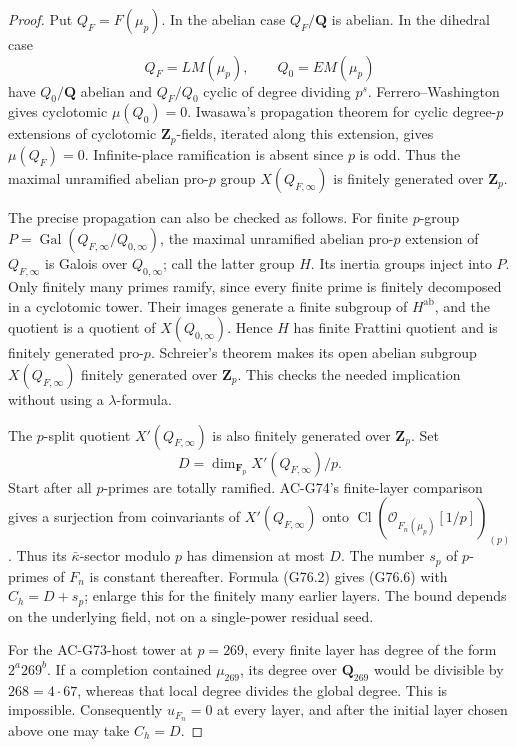 \begin{proof}
Put \(Q_F=F(\mu_p)\). In the abelian case \(Q_F/\mathbf Q\) is abelian. In the dihedral case
\[
 Q_F=LM(\mu_p),\qquad Q_0=EM(\mu_p)
\]
have \(Q_0/\mathbf Q\) abelian and \(Q_F/Q_0\) cyclic of degree dividing \(p^s\). Ferrero--Washington gives cyclotomic \(\mu(Q_0)=0\). Iwasawa's propagation theorem for cyclic degree-\(p\) extensions of cyclotomic \(\mathbf Z_p\)-fields, iterated along this extension, gives \(\mu(Q_F)=0\). Infinite-place ramification is absent since \(p\) is odd. Thus the maximal unramified abelian pro-\(p\) group \(X(Q_{F,\infty})\) is finitely generated over \(\mathbf Z_p\).

The precise propagation can also be checked as follows. For finite \(p\)-group \(P=\operatorname{Gal}(Q_{F,\infty}/Q_{0,\infty})\), the maximal unramified abelian pro-\(p\) extension of \(Q_{F,\infty}\) is Galois over \(Q_{0,\infty}\); call the latter group \(H\). Its inertia groups inject into \(P\). Only finitely many primes ramify, since every finite prime is finitely decomposed in a cyclotomic tower. Their images generate a finite subgroup of \(H^{\mathrm{ab}}\), and the quotient is a quotient of \(X(Q_{0,\infty})\). Hence \(H\) has finite Frattini quotient and is finitely generated pro-\(p\). Schreier's theorem makes its open abelian subgroup \(X(Q_{F,\infty})\) finitely generated over \(\mathbf Z_p\). This checks the needed implication without using a \(\lambda\)-formula.

The \(p\)-split quotient \(X'(Q_{F,\infty})\) is also finitely generated over \(\mathbf Z_p\). Set
\[
 D=\dim_{\mathbf F_p}X'(Q_{F,\infty})/p.
\]
Start after all \(p\)-primes are totally ramified. AC-G74's finite-layer comparison gives a surjection from coinvariants of \(X'(Q_{F,\infty})\) onto
\(\operatorname{Cl}(\mathcal O_{F_n(\mu_p)}[1/p])_{(p)}\).
Thus its \(\bar\kappa\)-sector modulo \(p\) has dimension at most \(D\). The number \(s_p\) of \(p\)-primes of \(F_n\) is constant thereafter. Formula (G76.2) gives (G76.6) with \(C_h=D+s_p\); enlarge this for the finitely many earlier layers. The bound depends on the underlying field, not on a single-power residual seed.

For the AC-G73-host tower at \(p=269\), every finite layer has degree of the form \(2^a269^b\). If a completion contained \(\mu_{269}\), its degree over \(\mathbf Q_{269}\) would be divisible by \(268=4\cdot67\), whereas that local degree divides the global degree. This is impossible. Consequently \(u_{F_n}=0\) at every layer, and after the initial layer chosen above one may take \(C_h=D\).
\end{proof}

